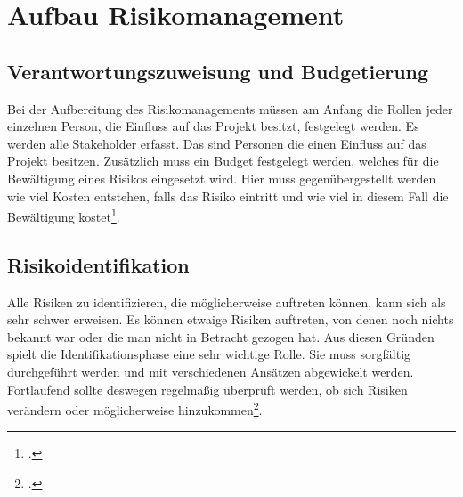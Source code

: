 \section{Aufbau Risikomanagement}
\subsection{Verantwortungszuweisung und Budgetierung}
Bei der Aufbereitung des Risikomanagements müssen am Anfang die Rollen jeder einzelnen Person, die Einfluss auf das Projekt besitzt, festgelegt werden. Es werden alle Stakeholder erfasst. Das sind Personen die einen Einfluss auf das Projekt besitzen.
Zusätzlich muss ein Budget festgelegt werden, welches für die Bewältigung eines Risikos eingesetzt wird. Hier muss gegenübergestellt werden wie viel Kosten entstehen, falls das Risiko eintritt und wie viel in diesem Fall die Bewältigung kostet\footcite{bva-risikomanagement}.

\subsection{Risikoidentifikation}
Alle Risiken zu identifizieren, die möglicherweise auftreten können, kann sich als sehr schwer erweisen. Es können etwaige Risiken auftreten, von denen noch nichts bekannt war oder die man nicht in Betracht gezogen hat. Aus diesen Gründen spielt die Identifikationsphase eine sehr wichtige Rolle. Sie muss sorgfältig durchgeführt werden und mit verschiedenen Ansätzen abgewickelt werden. Fortlaufend sollte deswegen regelmäßig überprüft werden, ob sich Risiken verändern oder möglicherweise hinzukommen\footcite{risikoidentifikation-definition}.

